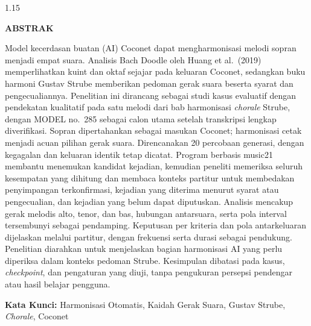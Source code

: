 \newpage
{}
{}
\begin{spacing}{1.15}
\begin{center}
    \textbf{ABSTRAK}
\end{center}

Model kecerdasan buatan (AI) Coconet dapat mengharmonisasi melodi sopran menjadi empat suara. Analisis Bach Doodle oleh Huang et al.\ (2019) memperlihatkan kuint dan oktaf sejajar pada keluaran Coconet, sedangkan buku harmoni Gustav Strube memberikan pedoman gerak suara beserta syarat dan pengecualiannya. Penelitian ini dirancang sebagai studi kasus evaluatif dengan pendekatan kualitatif pada satu melodi dari bab harmonisasi \textit{chorale} Strube, dengan MODEL no.~285 sebagai calon utama setelah transkripsi lengkap diverifikasi. Sopran dipertahankan sebagai masukan Coconet; harmonisasi cetak menjadi acuan pilihan gerak suara. Direncanakan 20 percobaan generasi, dengan kegagalan dan keluaran identik tetap dicatat. Program berbasis music21 membantu menemukan kandidat kejadian, kemudian peneliti memeriksa seluruh kesempatan yang dihitung dan membaca konteks partitur untuk membedakan penyimpangan terkonfirmasi, kejadian yang diterima menurut syarat atau pengecualian, dan kejadian yang belum dapat diputuskan. Analisis mencakup gerak melodis alto, tenor, dan bas, hubungan antarsuara, serta pola interval tersembunyi sebagai pendamping. Keputusan per kriteria dan pola antarkeluaran dijelaskan melalui partitur, dengan frekuensi serta durasi sebagai pendukung. Penelitian diarahkan untuk menjelaskan bagian harmonisasi AI yang perlu diperiksa dalam konteks pedoman Strube. Kesimpulan dibatasi pada kasus, \textit{checkpoint}, dan pengaturan yang diuji, tanpa pengukuran persepsi pendengar atau hasil belajar pengguna.\par

\noindent\textbf{Kata Kunci:} Harmonisasi Otomatis, Kaidah Gerak Suara, Gustav Strube, \textit{Chorale}, Coconet
\end{spacing}
